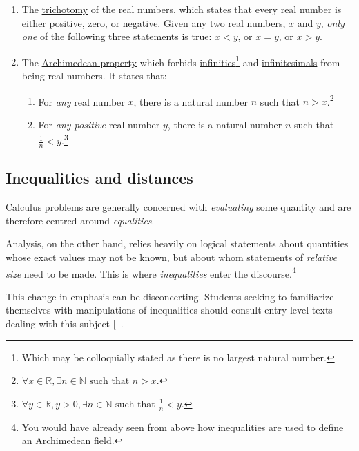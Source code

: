\documentclass[
  a4paper,
]{article}
\providecommand{\tightlist}{%
  \setlength{\itemsep}{0pt}\setlength{\parskip}{0pt}}
\begin{document}
\begin{enumerate}
\def\labelenumi{\alph{enumi}.}
\item
  The \href{https://en.wikipedia.org/wiki/Law_of_trichotomy}{trichotomy}
  of the real numbers, which states that every real number is either
  positive, zero, or negative. Given any two real numbers, \(x\) and
  \(y\), \emph{only one} of the following three statements is true:
  \(x < y\), or \(x = y\), or \(x > y\).
\item
  The \href{https://planetmath.org/archimedeanproperty}{Archimedean
  property} which forbids
  \href{https://en.wikipedia.org/wiki/Infinity}{infinities}\footnote{Which
    may be colloquially stated as there is no largest natural number.}
  and \href{https://en.wikipedia.org/wiki/Infinitesimal}{infinitesimals}
  from being real numbers. It states that:

  \begin{enumerate}
  \def\labelenumii{(\roman{enumii})}
  \tightlist
  \item
    For \emph{any} real number \(x\), there is a natural number \(n\)
    such that \(n > x\).\footnote{\(\forall x \in \mathbb{R}, \exists n \in \mathbb{N} \text{ such that } n > x.\)}
  \item
    For \emph{any positive} real number \(y\), there is a natural number
    \(n\) such that \(\frac{1}{n} < y\).\footnote{\(\forall y \in \mathbb{R}, y > 0, \exists n \in \mathbb{N} \text{ such that } \frac{1}{n} < y\).}
  \end{enumerate}
\end{enumerate}

\subsection{Inequalities and
distances}\label{inequalities-and-distances}

Calculus problems are generally concerned with \emph{evaluating} some
quantity and are therefore centred around \emph{equalities}.

Analysis, on the other hand, relies heavily on logical statements about
quantities whose exact values may not be known, but about whom
statements of \emph{relative size} need to be made. This is where
\emph{inequalities} enter the discourse.\footnote{You would have already
  seen from above how inequalities are used to define an Archimedean
  field.}

This change in emphasis can be disconcerting. Students seeking to
familiarize themselves with manipulations of inequalities should consult
entry-level texts dealing with this subject
{[}--\citeproc{ref-alsina-nelsen-2009}{3}{]}.
\end{document}
